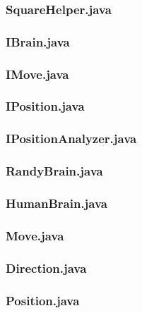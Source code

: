 \documentclass [12pt ,a4paper, english]{scrartcl}
\theoremstyle{plain}
\theoremstyle{definition}
\theoremstyle{remark}
\begin{document}
\subsubsection*{SquareHelper.java}


\subsubsection*{IBrain.java}
\label{sec:ibrain}


\subsubsection*{IMove.java}


\subsubsection*{IPosition.java}


\subsubsection*{IPositionAnalyzer.java}


\subsubsection*{RandyBrain.java}
\label{sec:randybrain}


\subsubsection*{HumanBrain.java}
\label{sec:humanbrain}


\subsubsection*{Move.java}


\subsubsection*{Direction.java}


\subsubsection*{Position.java}

\end{document}
